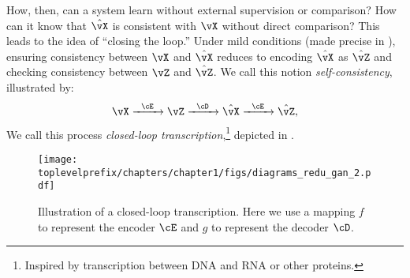 \documentclass[../../book-main.tex]{subfiles}
\begin{document}
How, then, can a system learn without external supervision or comparison? How can it know that \(\hat{\vX}\) is consistent with \(\vX\) without direct comparison? This leads to the idea of ``closing the loop.'' Under mild conditions (made precise in ), ensuring consistency between \(\vX\) and \(\hat{\vX}\) reduces to encoding \(\hat{\vX}\) as \(\hat{\vZ}\) and checking consistency between \(\vZ\) and \(\hat{\vZ}\). We call this notion \textit{self-consistency}, illustrated by:
\begin{equation}
    \vX   \xrightarrow{\hspace{2mm} \cE\hspace{2mm}} \vZ  \xrightarrow{\hspace{2mm} \cD \hspace{2mm}} \hat{\vX} \xrightarrow{\hspace{2mm} \cE\hspace{2mm}} \hat{\vZ},
    \label{eqn:closed-loop}
\end{equation}
We call this process \textit{closed-loop transcription},\footnote{Inspired by transcription between DNA and RNA or other proteins.} depicted in .

\begin{figure}[t]
    \centering
\texttt{[image: \\toplevelprefix/chapters/chapter1/figs/diagrams\_redu\_gan\_2.pdf]}
\caption{Illustration of a closed-loop transcription. Here we use a mapping \(f\) to represent the encoder \(\cE\) and \(g\) to represent the decoder \(\cD\).}  \label{fig:closed-loop}
\end{figure}
\end{document}
